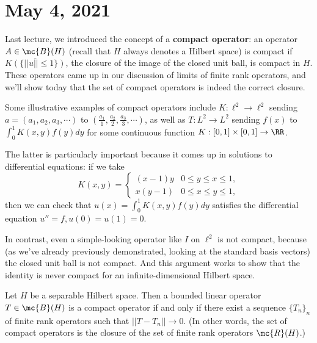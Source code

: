 
\pagebreak\section*{May 4, 2021}

Last lecture, we introduced the concept of a \textbf{compact operator}: an operator $A \in \mc{B}(H)$ (recall that $H$ always denotes a Hilbert space) is compact if $\overline{K(\{||u|| \le 1\})}$, the closure of the image of the closed unit ball, is compact in $H$. These operators came up in our discussion of limits of finite rank operators, and we'll show today that the set of compact operators is indeed the correct closure. 

\begin{example}
Some illustrative examples of compact operators include $K: \ell^2 \to \ell^2$ sending $a = (a_1, a_2, a_3, \cdots)$ to $(\frac{a_1}{1}, \frac{a_2}{2}, \frac{a_3}{3}, \cdots)$, as well as $T: L^2 \to L^2$ sending $f(x)$ to $\int_0^1 K(x, y) f(y) dy$ for some continuous function $K: [0, 1] \times [0, 1] \to \RR$.
\end{example}

The latter is particularly important because it comes up in solutions to differential equations: if we take 
\[
    K(x, y) = \begin{cases} (x-1) y & 0 \le y \le x \le 1, \\ x(y-1) & 0 \le x \le y \le 1, \end{cases} 
\] 
then we can check that $u(x) = \int_0^1 K(x, y) f(y) dy$ satisfies the differential equation $u'' = f, u(0) = u(1) = 0$. 

\begin{example}
In contrast, even a simple-looking operator like $I$ on $\ell^2$ is not compact, because (as we've already previously demonstrated, looking at the standard basis vectors) the closed unit ball is not compact. And this argument works to show that the identity is never compact for an infinite-dimensional Hilbert space.
\end{example}

\begin{theorem}
Let $H$ be a separable Hilbert space. Then a bounded linear operator $T \in \mc{B}(H)$ is a compact operator if and only if there exist a sequence $\{T_n\}_n$ of finite rank operators such that $||T - T_n|| \to 0$. (In other words, the set of compact operators is the closure of the set of finite rank operators $\mc{R}(H)$.)
\end{theorem}

